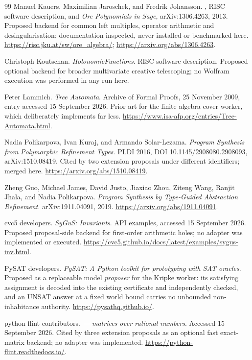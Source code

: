 \begin{thebibliography}{99}
Manuel Kauers, Maximilian Jaroschek, and Fredrik Johansson.
\emph{}, RISC software description, and \emph{Ore
Polynomials in Sage}, arXiv:1306.4263, 2013. Proposed backend for common left
multiples, operator arithmetic and desingularisation; documentation inspected,
never installed or benchmarked here.
\url{https://risc.jku.at/sw/ore_algebra/}; \url{https://arxiv.org/abs/1306.4263}.

Christoph Koutschan. \emph{HolonomicFunctions}. RISC software description.
Proposed optional backend for broader multivariate creative telescoping; no
Wolfram execution was performed in any run here.

Peter Lammich. \emph{Tree Automata}. Archive of Formal Proofs, 25 November
2009, entry accessed 15 September 2026. Prior art for the finite-algebra cover
worker, which deliberately implements far less.
\url{https://www.isa-afp.org/entries/Tree-Automata.html}.

Nadia Polikarpova, Ivan Kuraj, and Armando Solar-Lezama. \emph{Program
Synthesis from Polymorphic Refinement Types}. PLDI 2016,
DOI 10.1145/2908080.2908093, arXiv:1510.08419. Cited by two extension
proposals under different identifiers; merged here.
\url{https://arxiv.org/abs/1510.08419}.

Zheng Guo, Michael James, David Justo, Jiaxiao Zhou, Ziteng Wang, Ranjit
Jhala, and Nadia Polikarpova. \emph{Program Synthesis by Type-Guided
Abstraction Refinement}. arXiv:1911.04091, 2019.
\url{https://arxiv.org/abs/1911.04091}.

cvc5 developers. \emph{SyGuS: Invariants}. API examples, accessed 15 September
2026. Proposed proposal-side backend for first-order arithmetic holes; no
adapter was implemented or executed.
\url{https://cvc5.github.io/docs/latest/examples/sygus-inv.html}.

PySAT developers. \emph{PySAT: A Python toolkit for prototyping with SAT
oracles}. Proposed as a replaceable model \emph{proposer} for the Kripke
worker: its satisfying assignment is decoded into the existing certificate and
independently checked, and an UNSAT answer at a fixed world bound carries no
unbounded non-inhabitance authority.
\url{https://pysathq.github.io/}.

python-flint contributors. \emph{ --- matrices over rational
numbers}. Accessed 15 September 2026. Cited by three extension proposals as an
optional fast exact-matrix backend; no adapter was implemented.
\url{https://python-flint.readthedocs.io/}.

\end{thebibliography}
